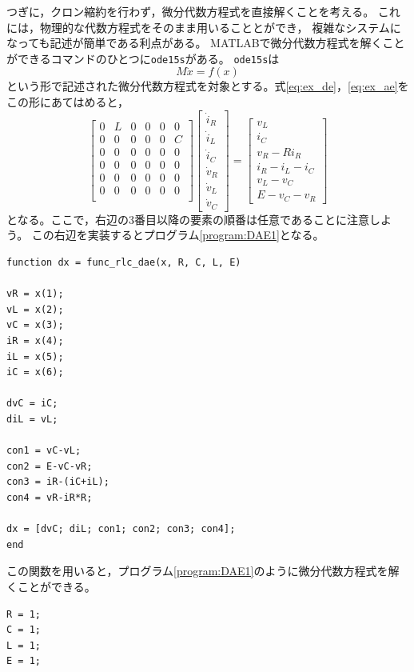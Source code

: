 {\begin{例}[簡単な例題]
つぎに，クロン縮約を行わず，微分代数方程式を直接解くことを考える。
これには，物理的な代数方程式をそのまま用いることとができ，
複雑なシステムになっても記述が簡単である利点がある。
MATLABで微分代数方程式を解くことができるコマンドのひとつに\verb|ode15s|がある。
\verb|ode15s|は
\[
  M\dot{x} = f(x)
\]
という形で記述された微分代数方程式を対象とする。式\ref{eq:ex_de}，\ref{eq:ex_ae}をこの形にあてはめると，
\[
  \begin{bmatrix}
    0 & L & 0 & 0 & 0 & 0 \\
    0 & 0 & 0 & 0 & 0 & C \\
    0 & 0 & 0 & 0 & 0 & 0 \\
    0 & 0 & 0 & 0 & 0 & 0 \\
    0 & 0 & 0 & 0 & 0 & 0 \\
    0 & 0 & 0 & 0 & 0 & 0 \\
  \end{bmatrix}
  \begin{bmatrix}
    \dot i_R \\\dot i_L\\\dot i_C\\\dot v_R\\\dot v_L\\\dot v_C
  \end{bmatrix}
  =\begin{bmatrix}
    v_L \\i_C\\v_R-R i_R\\i_R-i_L-i_C\\v_L-v_C\\E-v_C-v_R
  \end{bmatrix}
\]
となる。ここで，右辺の3番目以降の要素の順番は任意であることに注意しよう。
この右辺を実装するとプログラム\ref{program:DAE1}となる。

\begin{PROGRAMA}[count,title={func\_RLC\_DAE.m}]\label{program:DAE1}
  \begin{verbatim}
function dx = func_rlc_dae(x, R, C, L, E)

vR = x(1);
vL = x(2);
vC = x(3);
iR = x(4);
iL = x(5);
iC = x(6);

dvC = iC;
diL = vL;

con1 = vC-vL;
con2 = E-vC-vR;
con3 = iR-(iC+iL);
con4 = vR-iR*R;

dx = [dvC; diL; con1; con2; con3; con4];
end
\end{verbatim}
\end{PROGRAMA}
この関数を用いると，プログラム\ref{program:DAE1}のように微分代数方程式を解くことができる。
\begin{PROGRAMA}[count,title={main\_RLC\_DAE.m}]\label{program:DAE1}
  \begin{verbatim}
R = 1;
C = 1;
L = 1;
E = 1;


\end{verbatim}
\end{PROGRAMA}
\end{例}}
